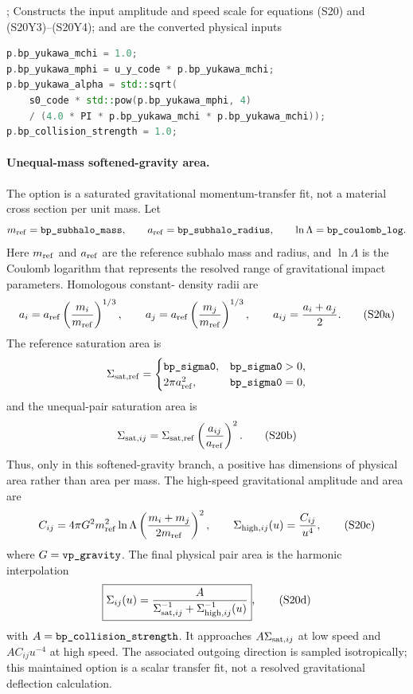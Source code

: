 {;
 }
{Constructs the input amplitude and speed scale for equations (S20) and
 (S20Y3)--(S20Y4);  and  are the converted
 physical inputs}
\begin{lstlisting}[language=C++]
p.bp_yukawa_mchi = 1.0;
p.bp_yukawa_mphi = u_y_code * p.bp_yukawa_mchi;
p.bp_yukawa_alpha = std::sqrt(
    s0_code * std::pow(p.bp_yukawa_mphi, 4)
    / (4.0 * PI * p.bp_yukawa_mchi * p.bp_yukawa_mchi));
p.bp_collision_strength = 1.0;
\end{lstlisting}

\paragraph{Unequal-mass softened-gravity area.}
The  option is a saturated gravitational
momentum-transfer fit, not a material cross section per unit mass.  Let
\[
 m_{\rm ref}=\code{bp_subhalo_mass},\qquad
 a_{\rm ref}=\code{bp_subhalo_radius},\qquad
 \ln\Lambda=\code{bp_coulomb_log}.
\]
Here \(m_{\rm ref}\) and \(a_{\rm ref}\) are the reference subhalo mass and
radius, and \(\ln\Lambda\) is the Coulomb logarithm that represents the
resolved range of gravitational impact parameters.  Homologous constant-
density radii are
\[
 a_i=a_{\rm ref}\left(\frac{m_i}{m_{\rm ref}}\right)^{1/3},
 \qquad
 a_j=a_{\rm ref}\left(\frac{m_j}{m_{\rm ref}}\right)^{1/3},
 \qquad
 a_{ij}=\frac{a_i+a_j}{2}.                                \tag{S20a}
\]
The reference saturation area is
\[
 \Sigma_{{\rm sat},{\rm ref}}=
 \begin{cases}
 \code{bp_sigma0},&\code{bp_sigma0}>0,\\
 2\pi a_{\rm ref}^2,&\code{bp_sigma0}=0,
 \end{cases}
\]
and the unequal-pair saturation area is
\[
 \Sigma_{{\rm sat},ij}
 =\Sigma_{{\rm sat},{\rm ref}}
  \left(\frac{a_{ij}}{a_{\rm ref}}\right)^2.              \tag{S20b}
\]
Thus, only in this softened-gravity branch, a positive
 has dimensions of physical area rather than area per mass.
The high-speed gravitational amplitude and area are
\[
 C_{ij}=4\pi G^2m_{\rm ref}^2\ln\Lambda
 \left(\frac{m_i+m_j}{2m_{\rm ref}}\right)^2,\qquad
 \Sigma_{{\rm high},ij}(u)=\frac{C_{ij}}{u^4},            \tag{S20c}
\]
where \(G=\code{vp_gravity}\).  The final physical pair area is the harmonic
interpolation
\[
 \boxed{\displaystyle
 \Sigma_{ij}(u)=
 \frac{A}{
  \Sigma_{{\rm sat},ij}^{-1}
  +\Sigma_{{\rm high},ij}^{-1}(u)}} ,                    \tag{S20d}
\]
with \(A=\code{bp_collision_strength}\).  It approaches
\(A\Sigma_{{\rm sat},ij}\) at low speed and
\(A C_{ij}u^{-4}\) at high speed.  The associated outgoing direction is
sampled isotropically; this maintained option is a scalar transfer fit, not a
resolved gravitational deflection calculation.


